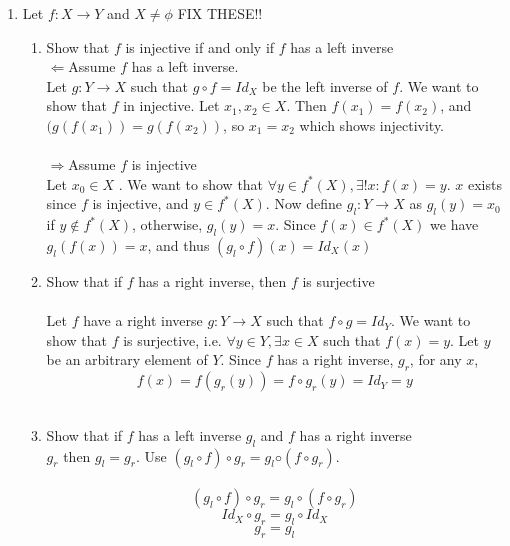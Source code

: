 \documentclass[11pt]{article}
\begin{document}
\begin{enumerate}
\item Let $f:X \to Y$ and $X \neq \phi$  FIX THESE!!
\begin{enumerate}
\item Show that $f$ is injective if and only if $f$ has a left inverse\\
$\Leftarrow$Assume $f$ has a left inverse.\\
Let $g : Y \to X$ such that $g \circ f = Id_X$ be the left inverse of $f$.  We want to show that $f$ in injective.  Let $x_1, x_2 \in X$.  Then $f(x_1) = f(x_2)$, and $(g(f(x_1)) = g(f(x_2))$, so $x_1 = x_2$ which shows injectivity.\\\\
$\Rightarrow$Assume $f$ is injective\\
Let $x_0 \in X$ .  We want to show that $\forall y \in f^*(X), \exists! x:f(x) = y.$  $x$ exists since $f$ is injective, and $y \in f^*(X)$.  Now define $g_l : Y \to X$ as $g_l(y) = x_0$ if $y \notin f^*(X)$, otherwise, $g_l(y) = x$.  Since $f(x) \in f^*(X)$ we have $g_l(f(x)) = x$, and thus $(g_l \circ f)(x) = Id_X(x)$
\item Show that if $f$ has a right inverse, then $f$ is surjective\\\\
Let $f$ have a right inverse $g : Y \to X$ such that  $f \circ g = Id_Y$.  We want to show that $f$ is surjective, i.e. $\forall y \in Y, \exists x \in X$ such that $f(x) = y$.  Let $y$ be an arbitrary element of $Y$.  Since $f$ has a right inverse, $g_r$, for any $x$,
$$f(x) = f(g_r(y)) = f \circ g_r(y) = Id_Y = y$$
\\
\item Show that if $f$ has a left inverse $g_l$ and $f$ has a right inverse\\
$g_r$ then $g_l = g_r$. Use $(g_l \circ f) \circ g_r = g_l ◦ (f \circ g_r )$.\\
\\
$$(g_l \circ f) \circ g_r = g_l \circ (f \circ g_r)$$
$$Id_X \circ g_r = g_l \circ Id_X$$
$$g_r = g_l$$
\end{enumerate} %


\end{enumerate}
\end{document}
